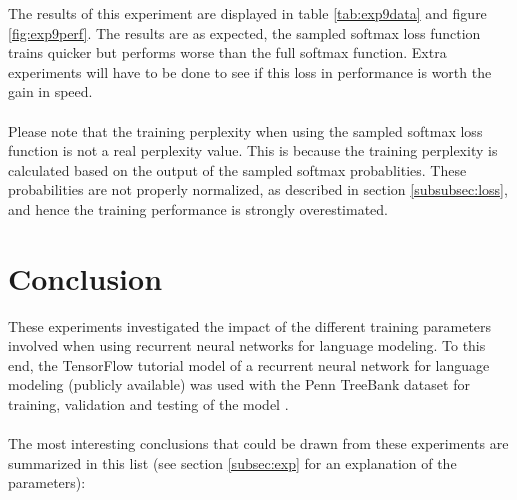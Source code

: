 \documentclass[10pt,a4paper,titlepage]{article}
\begin{document}
The results of this experiment are displayed in table \ref{tab:exp9data} and figure \ref{fig:exp9perf}. The results are as expected, the sampled softmax loss function trains quicker but performs worse than the full softmax function. Extra experiments will have to be done to see if this loss in performance is worth the gain in speed.\\
\\
Please note that the training perplexity when using the sampled softmax loss function is not a real perplexity value. This is because the training perplexity is calculated based on the output of the sampled softmax probablities. These probabilities are not properly normalized, as described in section \ref{subsubsec:loss}, and hence the training performance is strongly overestimated.

\newpage

\section{Conclusion}

These experiments investigated the impact of the different training parameters involved when using recurrent neural networks for language modeling. To this end, the TensorFlow tutorial model of a recurrent neural network for language modeling (publicly available) was used with the Penn TreeBank dataset for training, validation and testing of the model \cite{tensorflow}.\\
\\
The most interesting conclusions that could be drawn from these experiments are summarized in this list (see section \ref{subsec:exp} for an explanation of the parameters):
\end{document}
